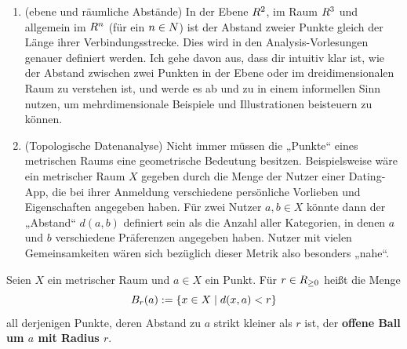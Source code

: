 \begin{bsp} \quad
    \begin{enumerate}
        \item(ebene und räumliche Abstände) In der Ebene $\relax R^2$, im Raum $\relax R^3$ und allgemein im $\relax R^n$ (für ein $n\in \relax N$) ist der Abstand zweier Punkte gleich der Länge ihrer Verbindungsstrecke. Dies wird in den Analysis-Vorlesungen genauer definiert werden.
        Ich gehe davon aus, dass dir intuitiv klar ist, wie der Abstand zwischen zwei Punkten in der Ebene oder im dreidimensionalen Raum zu verstehen ist, und werde es ab und zu in einem informellen Sinn nutzen, um mehrdimensionale Beispiele und Illustrationen beisteuern zu können.
        \item(Topologische Datenanalyse) Nicht immer müssen die „Punkte“ eines metrischen Raums eine geometrische Bedeutung besitzen. Beispielsweise wäre ein metrischer Raum $X$ gegeben durch die Menge der Nutzer einer Dating-App, die bei ihrer Anmeldung verschiedene persönliche Vorlieben und Eigenschaften angegeben haben. Für zwei Nutzer $a,b\in X$ könnte dann der „Abstand“ $d(a,b)$ definiert sein als die Anzahl aller Kategorien, in denen $a$ und $b$ verschiedene Präferenzen angegeben haben. Nutzer mit vielen Gemeinsamkeiten wären sich bezüglich dieser Metrik also besonders „nahe“.
    \end{enumerate}
\end{bsp}


\begin{defin} \label{def:ball} 
    Seien $X$ ein metrischer Raum und $a\in X$ ein Punkt. Für $r\in \relax R_{\ge 0}$ heißt die Menge
        \[ \relax B_r(a) := \{ x\in X \mid d(x,a)< r\} \]
    all derjenigen Punkte, deren Abstand zu $a$ strikt kleiner als $r$ ist, der \textbf{offene Ball um $a$ mit Radius $r$}.
\end{defin}


